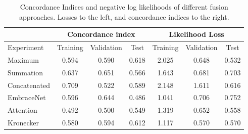 \begin{table}[h!b]
    \centering
    \caption[Fusion networks metrics]{Concordance Indices and negative log likelihoods of different fusion approaches. Losses to the left, and concordance indices to the right.}
    \begin{tabular}{l | c c c | c c c }
         \hline
        \multirow{2}{*}{} & \multicolumn{3}{c|}{Concordance index} & \multicolumn{3}{c}{Likelihood Loss} \\ [0.5ex]
        \hline
       Experiment & Training & Validation & Test & Training & Validation & Test \\ [0.5ex]
       \hline  
        Maximum        & 0.594 & 0.590 & 0.618  & 2.025 & 0.648 & 0.532 \\
        Summation      & 0.637 & 0.651 & 0.566  & 1.643 & 0.681 & 0.703 \\
        Concatenated  & 0.709 & 0.522 & 0.589  & 2.148 & 1.611 & 0.616 \\
        EmbraceNet     & 0.596 & 0.644 & 0.486  & 1.041 & 0.706 & 0.752 \\
        Attention      & 0.492 & 0.500 & 0.549  & 1.319 & 0.652 & 0.558 \\
        Kronecker      & 0.580 & 0.594 & 0.612  & 1.117 & 0.570 & 0.570 \\
        \hline
    \end{tabular}
    \label{tab:c_indices_fuse}
\end{table}


